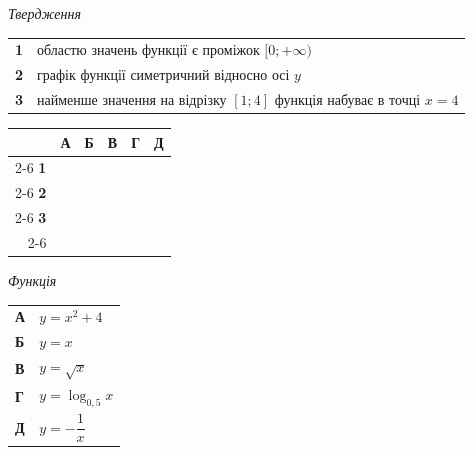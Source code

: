 \documentclass[14pt]{extarticle}
\newcommand{\answerGrid}{
    \begingroup
    \renewcommand{\arraystretch}{1.3} 
    \setlength{\tabcolsep}{7pt} 
    \begin{tabular}{r|c|c|c|c|c|}
         \multicolumn{1}{c}{} & \multicolumn{1}{c}{\textbf{А}} & \multicolumn{1}{c}{\textbf{Б}} & \multicolumn{1}{c}{\textbf{В}} & \multicolumn{1}{c}{\textbf{Г}} & \multicolumn{1}{c}{\textbf{Д}} \\ \cline{2-6}
         \textbf{1} & & & & & \\ \cline{2-6}
         \textbf{2} & & & & & \\ \cline{2-6}
         \textbf{3} & & & & & \\ \cline{2-6}
    \end{tabular}
    \endgroup
}
\begin{document}
\noindent
\begin{minipage}[t]{0.50\textwidth}
    \textit{Твердження} \par \vspace{0.2cm}
    \begin{tabular}{@{}p{0.5cm} p{7cm}@{}}
    \textbf{1} & областю значень функції є проміжок $[0; +\infty)$ \\
    \textbf{2} & графік функції симетричний відносно осі $y$ \\
    \textbf{3} & найменше значення на відрізку $[1; 4]$ функція набуває в точці $x=4$ \\
    \end{tabular}
    
    \vspace{0.3cm}
    \answerGrid
\end{minipage}%
\hfill
\begin{minipage}[t]{0.45\textwidth}
    \textit{Функція} \par \vspace{0.2cm}
    \begin{tabular}{ll}
    \textbf{А} & $y=x^2+4$ \\[0.3cm]
    \textbf{Б} & $y=x$ \\[0.3cm]
    \textbf{В} & $y=\sqrt{x}$ \\[0.3cm]
    \textbf{Г} & $y=\log_{0{,}5} x$ \\[0.3cm]
    \textbf{Д} & $y=-\dfrac{1}{x}$ \\
    \end{tabular}
\end{minipage}

\vspace{0.7cm}
\end{document}
